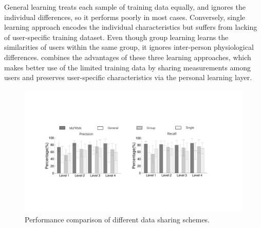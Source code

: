 General learning treats each sample of training data equally, and ignores the individual differences, so it performs poorly in most cases.
Conversely, single learning approach encodes the individual characteristics but suffers from lacking of user-specific training dataset. Even though group learning learns the similarities of users within the same group, it ignores inter-person physiological differences.
\modelname combines the advantages of these three learning approaches, which makes better use of the limited training data by sharing measurements among users and preserves user-specific characteristics via the personal learning layer.



\begin{figure}[h]
  \centering
  \includegraphics[width=0.9\columnwidth]{./img/performance_of_multi_division.pdf}
  \caption{Performance comparison of different data sharing schemes.}
  \label{fig:cmp_multi_division}
\end{figure}



